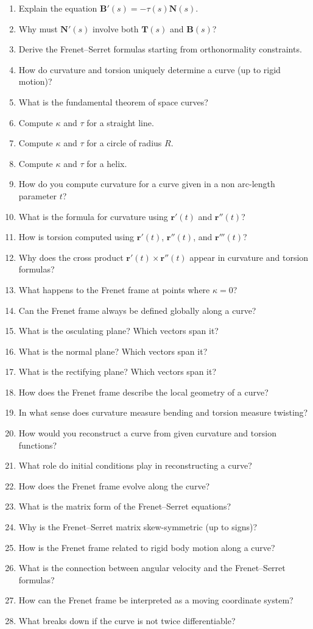 \begin{enumerate}
  \item Explain the equation $\mathbf{B}'(s) = -\tau(s)\mathbf{N}(s)$.
  \item Why must $\mathbf{N}'(s)$ involve both $\mathbf{T}(s)$ and $\mathbf{B}(s)$?
  \item Derive the Frenet--Serret formulas starting from orthonormality constraints.
  \item How do curvature and torsion uniquely determine a curve (up to rigid motion)?
  \item What is the fundamental theorem of space curves?
  \item Compute $\kappa$ and $\tau$ for a straight line.
  \item Compute $\kappa$ and $\tau$ for a circle of radius $R$.
  \item Compute $\kappa$ and $\tau$ for a helix.
  \item How do you compute curvature for a curve given in a non arc-length parameter $t$?
  \item What is the formula for curvature using $\mathbf{r}'(t)$ and $\mathbf{r}''(t)$?
  \item How is torsion computed using $\mathbf{r}'(t)$, $\mathbf{r}''(t)$, and $\mathbf{r}'''(t)$?
  \item Why does the cross product $\mathbf{r}'(t) \times \mathbf{r}''(t)$ appear in curvature and torsion formulas?
  \item What happens to the Frenet frame at points where $\kappa = 0$?
  \item Can the Frenet frame always be defined globally along a curve?
  \item What is the osculating plane? Which vectors span it?
  \item What is the normal plane? Which vectors span it?
  \item What is the rectifying plane? Which vectors span it?
  \item How does the Frenet frame describe the local geometry of a curve?
  \item In what sense does curvature measure bending and torsion measure twisting?
  \item How would you reconstruct a curve from given curvature and torsion functions?
  \item What role do initial conditions play in reconstructing a curve?
  \item How does the Frenet frame evolve along the curve?
  \item What is the matrix form of the Frenet--Serret equations?
  \item Why is the Frenet--Serret matrix skew-symmetric (up to signs)?
  \item How is the Frenet frame related to rigid body motion along a curve?
  \item What is the connection between angular velocity and the Frenet--Serret formulas?
  \item How can the Frenet frame be interpreted as a moving coordinate system?
  \item What breaks down if the curve is not twice differentiable?
\end{enumerate}
